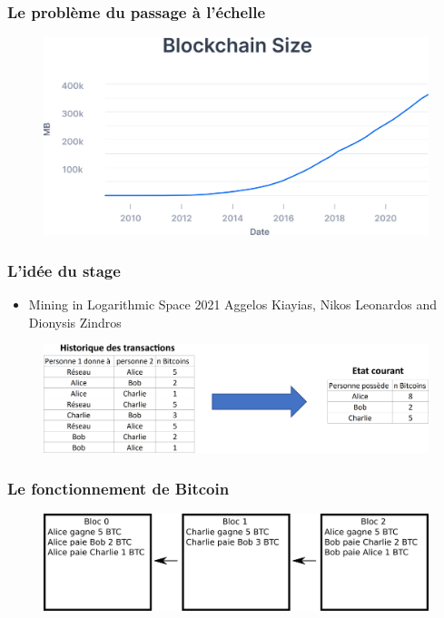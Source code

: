 \documentclass{beamer}
\begin{document}

\begin{frame}

\frametitle{Le problème du passage à l'échelle}

\begin{figure}[H]
		\includegraphics[width=\linewidth]{illustrationsSoutenance/blockchainSizeSourceless.png}
	\end{figure}

\end{frame}

\begin{frame}

\frametitle{L'idée du stage}

\begin{itemize}
	\item Mining in Logarithmic Space 2021 Aggelos Kiayias, Nikos Leonardos and Dionysis Zindros
\end{itemize}

\begin{figure}[H]
		\includegraphics[width=\linewidth]{illustrationsSoutenance/ideaTitle.png}
	\end{figure}

\end{frame}


\begin{frame}

\frametitle{Le fonctionnement de Bitcoin}

\begin{figure}[H]
		\includegraphics[width=\linewidth]{illustrationsSoutenance/blockchain.png}
	\end{figure}

\end{frame}
\end{document}
